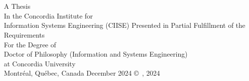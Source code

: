 
\thispagestyle{empty} %

\begin{center} 
\begin{Large} \subject \end{Large}\\[3em]
\begin{large} \student \end{large}\\
\vfill
A Thesis\\
In the Concordia Institute for 
\\ Information Systems Engineering (CIISE)
\vfill
Presented in Partial Fulfillment of the Requirements\\
For the Degree of\\
Doctor of Philosophy (Information and Systems Engineering)\\
at Concordia University\\
Montr\'{e}al, Qu\'{e}bec, Canada
\vfill
December 2024
\vfill
\copyright~\student, 2024\\

\end{center}



